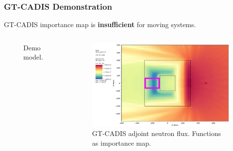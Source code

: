 \documentclass{beamer}
\begin{document}
%

\begin{frame}
\frametitle{GT-CADIS Demonstration}
	GT-CADIS importance map is \textbf{insufficient} for moving systems.

	\begin{columns}
        \begin{figure}
	\vspace{-0.9cm}
		\hspace{-1cm}
		\caption{Demo model.}
        \end{figure}

        \begin{figure}
	\centering
	\includegraphics[scale=0.20]{gtcadis_adjn_hi.jpg}
		\caption{GT-CADIS adjoint neutron flux. Functions as importance
		map.}
	\end{figure}
	\end{columns}

\end{frame}
\end{document}
